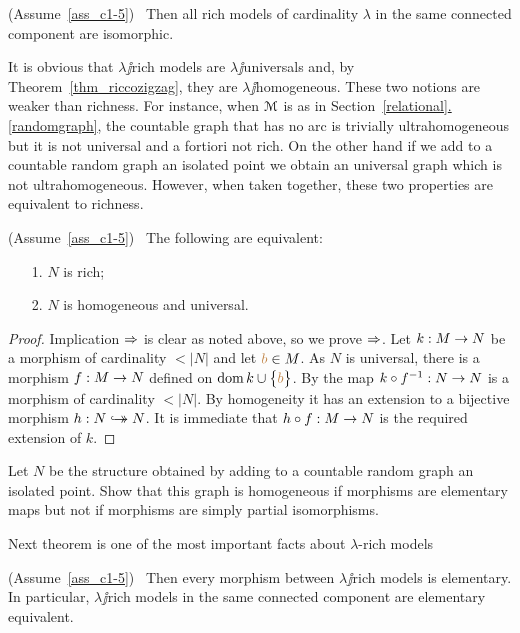 \documentclass[creche.tex]{subfiles}
\begin{document}
\begin{corollary}\label{coroll_riccozigzag}
(Assume~\ref{ass_c1-5})  \  Then all rich models of cardinality $\lambda$ in the same connected component are isomorphic.\QED
\end{corollary}

It is obvious that $\lambda\jj$rich models are $\lambda\jj$universals and, by Theorem~\ref{thm_riccozigzag}, they are $\lambda\jj$ho\-mo\-ge\-ne\-ous. These two notions are weaker than richness. For instance, when $\EuScript M$ is as in Section~\hyperref[randomgraph]{\ref*{relational}.\ref*{randomgraph}}, the countable graph that has no arc is trivially ultrahomogeneous but it is not universal and a fortiori not rich. On the other hand if we add to a countable random graph an isolated point we obtain an universal graph which is not ultrahomogeneous. However, when taken together, these two properties are equivalent to richness.

\begin{theorem}\label{ricco<->universaleomogeneo}
(Assume~\ref{ass_c1-5}) \ The following are equivalent:
\begin{itemize}
\item[1.] $N$ is rich;
\item[2.] $N$ is homogeneous and universal.
\end{itemize}
\end{theorem}
\begin{proof} 
Implication $\Rightarrow$ is clear as noted above, so we prove $\Rightarrow$. Let $k:M\rightarrow N$ be a morphism of cardinality $<|N|$ and let ${\color{brown} b}\in M$. As $N$ is universal, there is a morphism \hbox{$f:M\rightarrow N$} defined on $\mathop{\rm dom} k\cup\big\{{\color{brown} b}\big\}$. By  the map $k\circ f^{-1}:N\rightarrow N$ is a morphism of cardinality $<|N|$. By homogeneity it has an extension to a bijective morphism $h:N\hookrightarrow\mathrel{\mspace{-15mu}}\rightarrow N$. It is immediate that $h\circ f:M\rightarrow N$ is the required extension of $k$.
\end{proof}


\begin{exercise}
Let $N$ be the structure obtained by adding to a countable random graph an isolated point. Show that this graph is homogeneous if morphisms are elementary maps but not if morphisms are simply partial isomorphisms.\QED
\end{exercise}

Next theorem is one of the most important facts about $\lambda$-rich models

\begin{theorem}\label{thm_morphism_rich_elementary}
(Assume~\ref{ass_c1-5})  \  Then every morphism between $\lambda\jj$rich models is elementary. In particular, $\lambda\jj$rich models in the same connected component are elementary equivalent.
\end{theorem}
\end{document}
